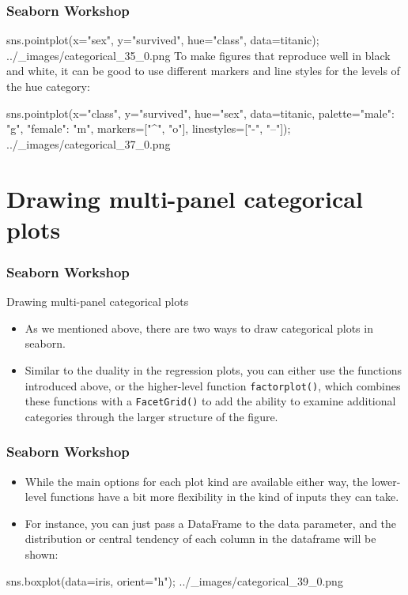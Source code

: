 \begin{frame}[fragile]
	\frametitle{Seaborn Workshop}
sns.pointplot(x="sex", y="survived", hue="class", data=titanic);
../_images/categorical_35_0.png
To make figures that reproduce well in black and white, it can be good to use different markers and line styles for the levels of the hue category:

sns.pointplot(x="class", y="survived", hue="sex", data=titanic,
              palette={"male": "g", "female": "m"},
              markers=["^", "o"], linestyles=["-", "--"]);
../_images/categorical_37_0.png
\end{frame}
\section{Drawing multi-panel categorical plots}
\begin{frame}[fragile]
\frametitle{Seaborn Workshop}
\large


Drawing multi-panel categorical plots
\begin{itemize}
\item As we mentioned above, there are two ways to draw categorical plots in seaborn. 
\item Similar to the duality in the regression plots, you can either use the functions introduced above, or the higher-level function \texttt{factorplot()}, which combines these functions with a \texttt{FacetGrid()} to add the ability to examine additional categories through the larger structure of the figure.
\end{itemize}

\end{frame}
\begin{frame}[fragile]
	\frametitle{Seaborn Workshop}
	\large
\begin{itemize}
\item While the main options for each plot kind are available either way, the lower-level functions have a bit more flexibility in the kind of inputs they can take.
\item For instance, you can just pass a DataFrame to the data parameter, and the distribution or central tendency of each column in the dataframe will be shown:
\end{itemize}


sns.boxplot(data=iris, orient="h");
../_images/categorical_39_0.png
\end{frame}
